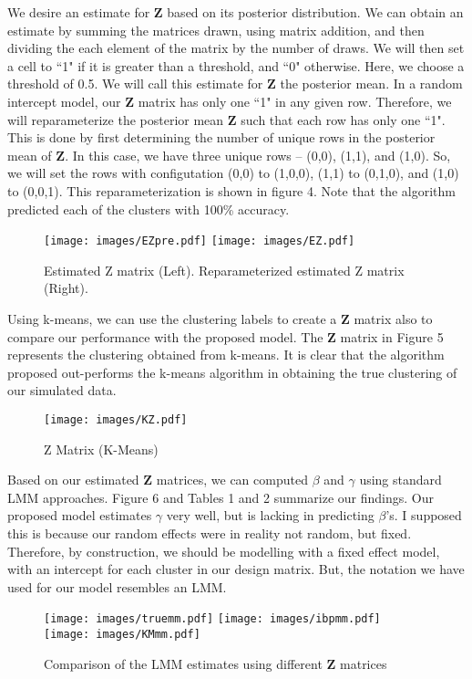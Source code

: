 \documentclass[mathserif]{article}
\def\beginmyfig{\begin{figure}[htbp]\begin{center}}
\def\endmyfig{\end{center}\end{figure}}
\newcommand{\m}[1]{\mathbf{\bm{#1}}} %
\begin{document}
\noindent
We desire an estimate for $\m{Z}$ based on its posterior distribution. We can obtain an 
estimate by summing the matrices drawn, using matrix addition, and then dividing the
each element of the matrix by the number of draws. We will then set a cell to ``1" if it
is greater than a threshold, and ``0" otherwise. Here, we choose a threshold of 0.5. 
We will call this estimate for $\m{Z}$ the posterior mean. In a random intercept model,
our $\m{Z}$ matrix has only one ``1" in any given row. Therefore, we will reparameterize
the posterior mean $\m{Z}$ such that each row has only one ``1". This is done by first
determining the number of unique rows in the posterior mean of $\m{Z}$. In this case, 
we have three unique rows -- (0,0), (1,1), and (1,0). So, we will set the rows with 
configutation (0,0) to (1,0,0), (1,1) to (0,1,0), and (1,0) to (0,0,1). This
reparameterization is shown in figure 4. Note that the algorithm predicted
each of the clusters with 100\% accuracy.\\
\beginmyfig
  \texttt{[image: images/EZpre.pdf]}
  \texttt{[image: images/EZ.pdf]}
  \vspace{-5mm}
  \caption{Estimated Z matrix (Left). Reparameterized estimated Z matrix (Right).}
\endmyfig  

\noindent
Using k-means, we can use the clustering labels to create a $\m{Z}$ matrix also to compare
our performance with the proposed model. The $\m{Z}$ matrix in Figure 5 represents the
clustering obtained from k-means. It is clear that the algorithm proposed out-performs
the k-means algorithm in obtaining the true clustering of our simulated data.
\beginmyfig
  \texttt{[image: images/KZ.pdf]}
  \vspace{-5mm}
  \caption{Z Matrix (K-Means)}
\endmyfig  

\noindent
Based on our estimated $\m{Z}$ matrices, we can computed $\beta$ and $\gamma$ using 
standard LMM approaches. Figure 6 and Tables 1 and 2 summarize our findings. Our proposed
model estimates $\gamma$ very well, but is lacking in predicting $\beta$'s. I supposed
this is because our random effects were in reality not random, but fixed. Therefore,
by construction, we should be modelling with a fixed effect model, with an intercept for
each cluster in our design matrix. But, the notation we have used for our model resembles an
LMM.\\
\beginmyfig
  \texttt{[image: images/truemm.pdf]}
  \texttt{[image: images/ibpmm.pdf]}
  \texttt{[image: images/KMmm.pdf]}
  \vspace{-5mm}
  \caption{Comparison of the LMM estimates using different $\m{Z}$ matrices}
\endmyfig
\end{document}
